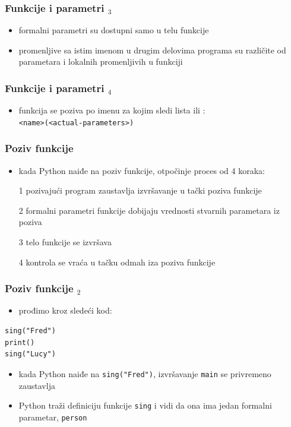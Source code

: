 \documentclass[utf8,compress]{beamer}
\begin{document}
\begin{frame}[fragile]
  \frametitle{Funkcije i parametri $_3$}
  \begin{itemize}
    \item formalni parametri su dostupni samo u telu funkcije
    \item promenljive sa istim imenom u drugim delovima programa su različite od parametara i lokalnih promenljivih u funkciji
  \end{itemize}
\end{frame}

\begin{frame}[fragile]
  \frametitle{Funkcije i parametri $_4$}
  \begin{itemize}
    \item funkcija se poziva po imenu za kojim sledi lista  ili : \\
      \texttt{<name>(<actual-parameters>)}
  \end{itemize}
\end{frame}

\begin{frame}[fragile]
  \frametitle{Poziv funkcije}
  \begin{itemize}
    \item kada Python naiđe na poziv funkcije, otpočinje proces od 4 koraka:
    \item[1] pozivajući program zaustavlja izvršavanje u tački poziva funkcije
    \item[2] formalni parametri funkcije dobijaju vrednosti stvarnih parametara iz poziva
    \item[3] telo funkcije se izvršava
    \item[4] kontrola se vraća u tačku odmah iza poziva funkcije
  \end{itemize}
\end{frame}

\begin{frame}[fragile]
  \frametitle{Poziv funkcije $_2$}
  \begin{itemize}
    \item prođimo kroz sledeći kod:
  \end{itemize}
\begin{verbatim}
sing("Fred")
print()
sing("Lucy")
\end{verbatim}
  \begin{itemize}
    \item kada Python naiđe na \texttt{sing("Fred")}, izvršavanje \texttt{main} se privremeno zaustavlja
    \item Python traži definiciju funkcije \texttt{sing} i vidi da ona ima jedan formalni parametar, \texttt{person}
  \end{itemize}
\end{frame}
\end{document}
